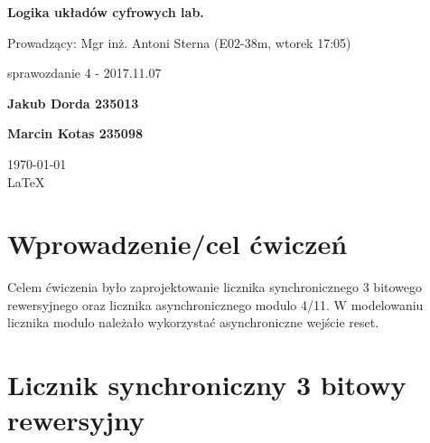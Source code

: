 \documentclass[12pt,a4paper]{article}
\begin{document}
	
	\begin{titlepage}
		
		\centering
		{\huge\bfseries Logika układów cyfrowych lab.\par}
		
		\vspace{0.5cm}
		Prowadzący: Mgr inż. Antoni Sterna (E02-38m, wtorek 17:05) \\
	
		\vspace{1.1cm}
		{\Large sprawozdanie 4 - 2017.11.07\par}
		\vfill
		
		{\large\bfseries Jakub Dorda 235013\par}
		{\large\bfseries Marcin Kotas 235098\par}
		
		\vspace{1cm}
		\today \\ \LaTeX
		
		\restoregeometry
	\end{titlepage}

	
	\section{Wprowadzenie/cel ćwiczeń}
		
		Celem ćwiczenia było zaprojektowanie licznika synchronicznego 3 bitowego rewersyjnego oraz licznika asynchronicznego modulo 4/11. W modelowaniu licznika modulo należało wykorzystać asynchroniczne wejście reset.
	
		
	\section{Licznik synchroniczny 3 bitowy rewersyjny}
		
\end{document}
